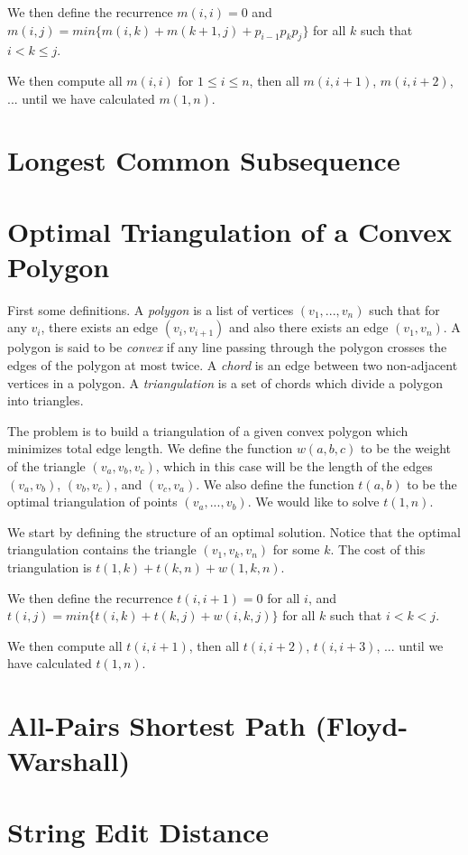 We then define the recurrence $m(i,i) = 0$ and $m(i,j) = min \{ m(i,k) +
m(k+1,j) + p_{i-1}p_kp_j \}$ for all $k$ such that $i < k \leq j$.

We then compute all $m(i,i)$ for $1 \leq i \leq n$, then all
$m(i,i+1)$, $m(i,i+2)$, ... until we have calculated $m(1,n)$.

\section{Longest Common Subsequence}

\section{Optimal Triangulation of a Convex Polygon}


First some definitions.  A \emph{polygon} is a list of vertices
$(v_1,...,v_n)$ such that for any $v_i$, there exists an edge
$(v_i,v_{i+1})$ and also there exists an edge $(v_1,v_n)$.  A polygon
is said to be \emph{convex} if any line passing through the polygon
crosses the edges of the polygon at most twice.  A \emph{chord} is an
edge between two non-adjacent vertices in a polygon.  A
\emph{triangulation} is a set of chords which divide a polygon into
triangles.

The problem is to build a triangulation of a given convex polygon
which minimizes total edge length.  We define the function $w(a,b,c)$
to be the weight of the triangle $(v_a,v_b,v_c)$, which in this case
will be the length of the edges $(v_a,v_b)$, $(v_b,v_c)$, and
$(v_c,v_a)$.  We also define the function $t(a,b)$ to be the optimal
triangulation of points $(v_a,...,v_b)$.  We would like to solve
$t(1,n)$.

We start by defining the structure of an optimal solution.  Notice
that the optimal triangulation contains the triangle $(v_1,v_k,v_n)$
for some $k$.  The cost of this triangulation is $t(1,k) + t(k,n) +
w(1,k,n)$.

We then define the recurrence $t(i,i+1) = 0$ for all $i$, and $t(i,j)
= min \{ t(i,k) + t(k,j) + w(i,k,j) \}$ for all $k$ such that $i < k < j$.

We then compute all $t(i,i+1)$, then all $t(i,i+2)$, $t(i,i+3)$,
... until we have calculated $t(1,n)$.

\hypertarget{sec:floyd_warshall}{\section{All-Pairs Shortest Path (Floyd-Warshall)}}

\section{String Edit Distance}

